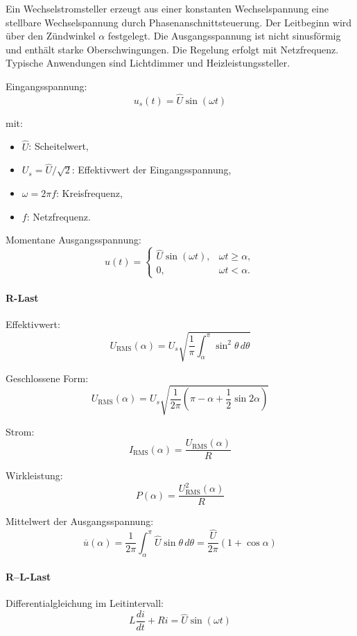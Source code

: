 Ein Wechselstromsteller erzeugt aus einer konstanten Wechselspannung eine stellbare Wechselspannung
durch Phasenanschnittsteuerung.
Der Leitbeginn wird über den Zündwinkel $\alpha$ festgelegt.
Die Ausgangsspannung ist nicht sinusförmig und enthält starke Oberschwingungen.
Die Regelung erfolgt mit Netzfrequenz.
Typische Anwendungen sind Lichtdimmer und Heizleistungssteller.

Eingangsspannung:
\[
u_s(t)=\hat U \sin(\omega t)
\]

mit:
\begin{itemize}
\item $\hat U$: Scheitelwert,
\item $U_s=\hat U/\sqrt{2}$: Effektivwert der Eingangsspannung,
\item $\omega=2\pi f$: Kreisfrequenz,
\item $f$: Netzfrequenz.
\end{itemize}

Momentane Ausgangsspannung:
\[
u(t)=
\begin{cases}
\hat U\sin(\omega t), & \omega t \ge \alpha,\\
0, & \omega t < \alpha.
\end{cases}
\]

\paragraph{R-Last}

Effektivwert:
\[
\boxed{
U_{\mathrm{RMS}}(\alpha)
=U_s\sqrt{\frac{1}{\pi}\int_{\alpha}^{\pi}\sin^2\theta\,d\theta}
}
\]

Geschlossene Form:
\[
\boxed{
U_{\mathrm{RMS}}(\alpha)
=U_s\sqrt{\frac{1}{2\pi}\left(\pi-\alpha+\frac{1}{2}\sin 2\alpha\right)}
}
\]

Strom:
\[
\boxed{I_{\mathrm{RMS}}(\alpha)=\frac{U_{\mathrm{RMS}}(\alpha)}{R}}
\]

Wirkleistung:
\[
\boxed{P(\alpha)=\frac{U_{\mathrm{RMS}}^2(\alpha)}{R}}
\]

Mittelwert der Ausgangsspannung:
\[
\boxed{
\overline{u}(\alpha)=\frac{1}{2\pi}\int_{\alpha}^{\pi}\hat U\sin\theta\,d\theta
=\frac{\hat U}{2\pi}(1+\cos\alpha)
}
\]

\paragraph{R--L-Last}

Differentialgleichung im Leitintervall:
\[
L\frac{di}{dt}+Ri=\hat U\sin(\omega t)
\]

